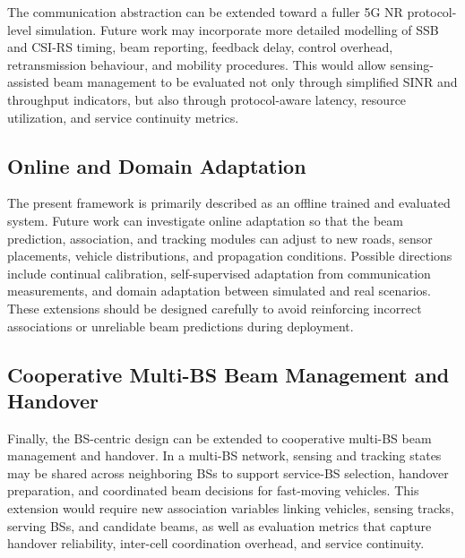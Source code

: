 The communication abstraction can be extended toward a fuller 5G NR
protocol-level simulation. Future work may incorporate more detailed modelling
of SSB and CSI-RS timing, beam reporting, feedback delay, control overhead,
retransmission behaviour, and mobility procedures. This would allow
sensing-assisted beam management to be evaluated not only through simplified
SINR and throughput indicators, but also through protocol-aware latency,
resource utilization, and service continuity metrics.

\subsection{Online and Domain Adaptation}
\label{subsec:future-online-adaptation}

The present framework is primarily described as an offline trained and
evaluated system. Future work can investigate online adaptation so that the
beam prediction, association, and tracking modules can adjust to new roads,
sensor placements, vehicle distributions, and propagation conditions. Possible
directions include continual calibration, self-supervised adaptation from
communication measurements, and domain adaptation between simulated and real
scenarios. These extensions should be designed carefully to avoid reinforcing
incorrect associations or unreliable beam predictions during deployment.

\subsection{Cooperative Multi-BS Beam Management and Handover}
\label{subsec:future-multi-bs-handover}

Finally, the BS-centric design can be extended to cooperative multi-BS beam
management and handover. In a multi-BS network, sensing and tracking states may
be shared across neighboring BSs to support service-BS selection, handover
preparation, and coordinated beam decisions for fast-moving vehicles. This
extension would require new association variables linking vehicles, sensing
tracks, serving BSs, and candidate beams, as well as evaluation metrics that
capture handover reliability, inter-cell coordination overhead, and service
continuity.
